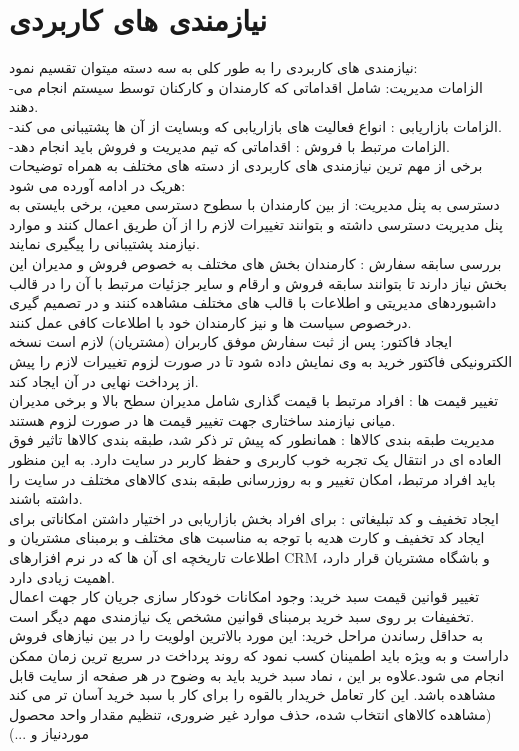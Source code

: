 \documentclass[12pt]{report}
\begin{document}
\section{نیازمندی های کاربردی }
نیازمندی های کاربردی را به طور کلی به سه دسته میتوان تقسیم نمود:\\
-الزامات مدیریت: شامل اقداماتی که کارمندان و کارکنان توسط سیستم انجام می دهند. \\
-الزامات بازاریابی : انواع فعالیت های بازاریابی که وبسایت از آن ها پشتیبانی می کند. \\
-الزامات مرتبط با فروش : اقداماتی که تیم مدیریت و فروش باید انجام دهد.\\
برخی از مهم ترین نیازمندی های کاربردی از دسته های مختلف به همراه توضیحات هریک در ادامه آورده می شود:\\
دسترسی به پنل مدیریت: از بین کارمندان با سطوح دسترسی معین، برخی بایستی به پنل مدیریت دسترسی داشته و بتوانند تغییرات لازم را از آن طریق اعمال کنند و موارد نیازمند پشتیبانی را پیگیری نمایند.\\
بررسی سابقه سفارش : کارمندان بخش های مختلف به خصوص فروش و مدیران این بخش نیاز دارند تا بتوانند سابقه فروش و ارقام و سایر جزئیات مرتبط با آن را در قالب داشبوردهای مدیریتی و اطلاعات با قالب های مختلف مشاهده کنند و در تصمیم گیری درخصوص سیاست ها و نیز کارمندان خود با اطلاعات کافی عمل کنند.\\
ایجاد فاکتور: پس از ثبت سفارش موفق کاربران (مشتریان) لازم است نسخه الکترونیکی فاکتور خرید به وی نمایش داده شود تا در صورت لزوم تغییرات لازم را پیش از پرداخت نهایی در آن ایجاد کند.\\
تغییر قیمت ها : افراد مرتبط با قیمت گذاری شامل مدیران سطح بالا و برخی مدیران میانی نیازمند ساختاری جهت تغییر قیمت ها در صورت لزوم هستند.\\
مدیریت طبقه بندی کالاها : همانطور که پیش تر ذکر شد، طبقه بندی کالاها تاثیر فوق العاده ای در انتقال یک تجربه خوب کاربری و حفظ کاربر در سایت دارد. به این منظور باید افراد مرتبط، امکان تغییر و به روزرسانی طبقه بندی کالاهای مختلف در سایت را داشته باشند.\\
ایجاد تخفیف و کد تبلیغاتی : برای افراد بخش بازاریابی در اختیار داشتن امکاناتی  برای ایجاد کد تخفیف و کارت هدیه با توجه به مناسبت های مختلف و برمبنای مشتریان و اطلاعات تاریخچه ای آن ها که در نرم افزارهای CRM و باشگاه مشتریان قرار دارد، اهمیت زیادی دارد.\\
تغییر قوانین قیمت سبد خرید: وجود امکانات خودکار سازی جریان کار جهت اعمال تخفیفات بر روی سبد خرید برمبنای قوانین مشخص یک نیازمندی مهم دیگر است.\\
 به حداقل رساندن مراحل خرید: این مورد بالاترین اولویت را در بین نیازهای فروش داراست و  به ویژه باید اطمینان کسب نمود که روند پرداخت در سریع ترین زمان ممکن انجام می شود.علاوه بر این ، نماد سبد خرید باید به وضوح در هر صفحه از سایت قابل مشاهده باشد. این کار تعامل خریدار بالقوه را برای کار با سبد خرید آسان تر می کند (مشاهده کالاهای انتخاب شده، حذف موارد غیر ضروری، تنظیم مقدار واحد محصول موردنیاز و ...)\\
\end{document}
